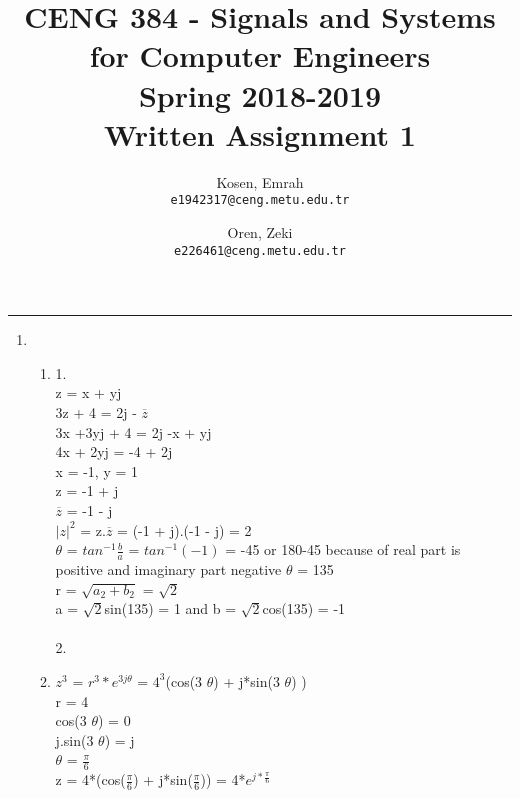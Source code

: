 \documentclass[10pt,a4paper, margin=1in]{article}
\author{
  Kosen, Emrah\\
  \texttt{e1942317@ceng.metu.edu.tr}
  \and
  Oren, Zeki\\
  \texttt{e226461@ceng.metu.edu.tr}
}
\title{CENG 384 - Signals and Systems for Computer Engineers \\
Spring 2018-2019 \\
Written Assignment 1}
\begin{document}
\maketitle



\noindent\rule{19cm}{1.2pt}

\begin{enumerate}

\item

    \begin{enumerate}
    \item %
    1.\\
    z = x + yj \\
    3z + 4 = 2j - $ \overline{z} $ \\
    3x +3yj + 4 = 2j -x + yj \\
    4x + 2yj = -4 + 2j \\
    x = -1, y = 1 \\
    z = -1 + j \\
    $\overline{z}$ = -1 - j\\
    $|z|^{2}$ = z.$\overline{z}$ = (-1 + j).(-1 - j) = 2\\
    $\theta$ = $tan^{-1}\frac{b}{a}$ = $tan^{-1}(-1)$ = -45 or 180-45 because of real part is positive and imaginary part negative  $\theta$ = 135\\
    r = $\sqrt{a_{2} + b_{2}}$ = $\sqrt{2}$\\
    a = $\sqrt{2}$sin(135) = 1  and  b = $\sqrt{2}$cos(135) = -1\\\\

    2.






    \item 
    $z^{3}$ = $ r^{3}*e^{3j\theta}$ = $4^{3}$(cos(3 $\theta$) + j*sin(3 $\theta$) )\\
    r = 4\\
    cos(3 $\theta$) = 0\\
    j.sin(3 $\theta$) = j\\
    $\theta$ = $\frac{\pi}{6}$\\
    z = 4*(cos($\frac{\pi}{6}$) + j*sin($\frac{\pi}{6}$)) = 4*$e^{j*\frac{\pi}{6}}$\\
    

\end{enumerate}
\end{enumerate}
\end{document}

